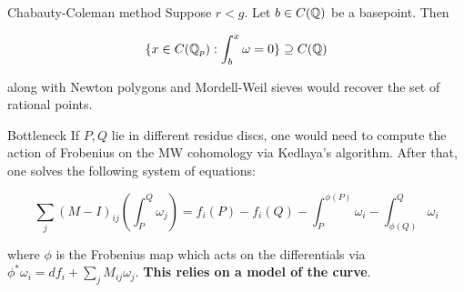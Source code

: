 \begin{frame}{Chabauty-Coleman method}
Suppose $r < g$. Let $b \in C(\mathbb{Q})$ be a basepoint. Then

\[
\{ x \in C(\mathbb{Q}_p): \int_b^x \omega = 0 \} \supseteq C(\mathbb{Q})
\]

along with Newton polygons and Mordell-Weil sieves would recover the set of rational points.

\end{frame}

\begin{frame}{Bottleneck}
If $P,Q$ lie in different residue discs, one would need to compute the action of Frobenius on the MW cohomology via Kedlaya's algorithm. After that, one solves the following system of equations:

\[
\sum_j (M - I)_{ij}(\int_P^Q \omega_j) = f_i(P) - f_i(Q) - \int_P^{\phi(P)} \omega_i - \int_{\phi(Q)}^Q \omega_i
\]

where $\phi$ is the Frobenius map which acts on the differentials via $\phi^* \omega_i = df_i + \sum_j M_{ij}\omega_j$. \textbf{This relies on a model of the curve}.
\end{frame}


